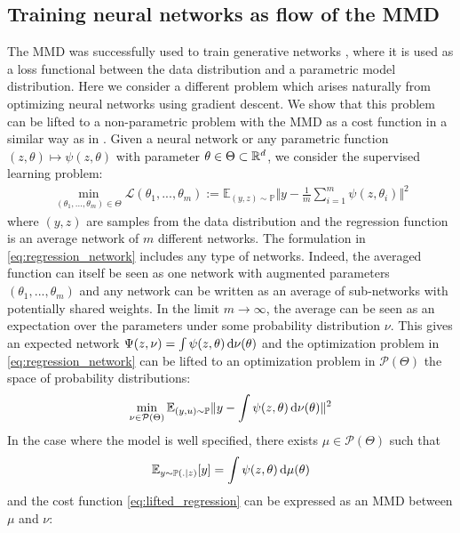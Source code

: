 \subsection{Training neural networks as flow of the MMD}
The MMD was successfully used to train generative networks \cite{Arbel:2018,Binkowski:2018}, where it is used as a loss functional between the data distribution and a parametric model distribution.
Here we consider a different problem which arises naturally from optimizing neural networks using gradient descent. We show that this problem can be lifted to a non-parametric problem with the MMD as a cost function in a similar way as in \cite{Rotskoff:2019}. Given a neural network or any parametric function $(z,\theta)\mapsto \psi(z,\theta)$ with parameter $\theta \in \Theta \subset {{\mathbb R}}^d$, we consider the supervised learning problem:
\begin{align}\label{eq:regression_network}
	\min_{(\theta_1,...,\theta_m )\in \Theta} \mathcal{L}(\theta_1,...,\theta_m):= \mathbb{E}_{(y,z)\sim \mathbb{P}  }  \Vert y - \frac{1}{m}\sum_{i=1}^m\psi(z,\theta_i) \Vert^2
\end{align}
where $(y,z)$ are samples from the data distribution and the regression function is an average network of $m$ different networks. The formulation in \cref{eq:regression_network} includes any type of networks. Indeed, the averaged function can itself be seen as one network with augmented parameters $(\theta_1,...,\theta_m)$ and any network can be written as an average of sub-networks with potentially shared weights. In the limit $m\rightarrow \infty$, the average can be seen as an expectation over the parameters under some probability distribution $\nu$. This gives an expected network $\Psi(z,\nu) =  \int \psi(z,\theta) \mathop{}\!\mathrm{d} \nu(\theta) $ and the optimization problem in \cref{eq:regression_network} can be lifted to an optimization problem in $\mathcal{P}(\Theta)$ the space of probability distributions:
\begin{align}\label{eq:lifted_regression}
	\min_{\nu \in \mathcal{P}(\Theta)} \mathbb{E}_{(y,u)\sim \mathbb{P} }  \Vert y - \int \psi(z,\theta) \mathop{}\!\mathrm{d} \nu(\theta) \Vert^2
\end{align} 
In the case where the model is well specified, there exists $\mu \in \mathcal{P}(\Theta) $ such that 
\begin{equation}
\mathbb{E}_{y\sim \mathbb{P}(.|z)}[y] =  \int \psi(z,\theta) \mathop{}\!\mathrm{d} \mu(\theta)
\end{equation}
and the cost function \cref{eq:lifted_regression} can be expressed as an MMD between $\mu$ and $\nu$:

